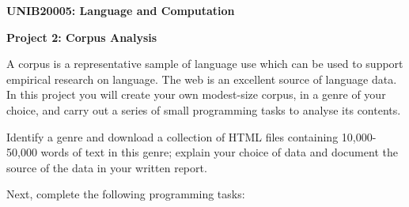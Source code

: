 \documentclass[a4paper]{article}
\begin{document}
\centerline{\LARGE\bf UNIB20005: Language and Computation}\vspace{2ex}

\centerline{\large\bf Project 2: Corpus Analysis}\vspace{2ex}

A corpus is a representative sample of language use which can be
used to support empirical research on language.  The web is an
excellent source of language data.  In this project you
will create your own modest-size corpus, in a genre of your choice,
and carry out a
series of small programming tasks to analyse its contents.

Identify a genre and download a collection of HTML files containing
10,000-50,000 words of text in this genre; explain your choice of
data and document the source of the data in your written report.

Next, complete the following programming tasks:
\end{document}
